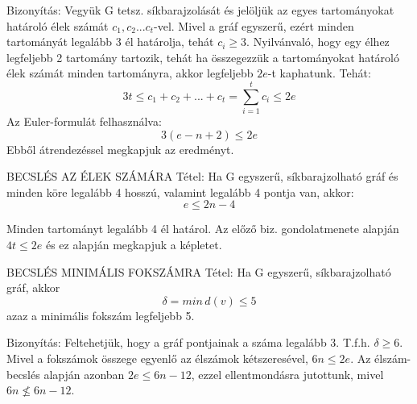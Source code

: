 \documentclass[]{article}
\begin{document}
\begin{leftbar}
Bizonyítás: Vegyük G tetsz. síkbarajzolását és jelöljük az egyes tartományokat határoló élek számát $c_1, c_2...c_t$-vel. Mivel a gráf egyszerű, ezért minden tartományát legalább 3 él határolja, tehát $c_i \geq 3$. Nyilvánvaló, hogy egy élhez legfeljebb 2 tartomány tartozik, tehát ha összegezzük a tartományokat határoló élek számát minden tartományra, akkor legfeljebb $2e$-t kaphatunk. Tehát:
$$3t \leq c_1 + c_2 + ... + c_t = \sum_{i=1}^{t} c_i \leq 2e$$
Az Euler-formulát felhasználva:
$$3(e - n + 2) \leq 2e$$
Ebből átrendezéssel megkapjuk az eredményt.
\end{leftbar}
\begin{framed}
BECSLÉS AZ ÉLEK SZÁMÁRA Tétel: Ha G egyszerű, síkbarajzolható gráf és minden köre legalább 4 hosszú, valamint legalább 4 pontja van, akkor:
$$e \leq 2n - 4$$
\end{framed}
\begin{leftbar}
Minden tartományt legalább 4 él határol. Az előző biz. gondolatmenete alapján $4t \leq 2e$ és ez alapján megkapjuk a képletet.
\end{leftbar}
\begin{framed}
BECSLÉS MINIMÁLIS FOKSZÁMRA Tétel: Ha G egyszerű, síkbarajzolható gráf, akkor $$\delta = min\, d(v) \leq 5$$ azaz a minimális fokszám legfeljebb 5.
\end{framed}
\begin{leftbar}
Bizonyítás: Feltehetjük, hogy a gráf pontjainak a száma legalább 3. T.f.h. $\delta \geq 6$. Mivel a fokszámok összege egyenlő az élszámok kétszeresével, $6n \leq 2e$. Az élszám-becslés alapján azonban $2e \leq 6n - 12$, ezzel ellentmondásra jutottunk, mivel $6n \not\leq 6n - 12$.
\end{leftbar}
\end{document}

